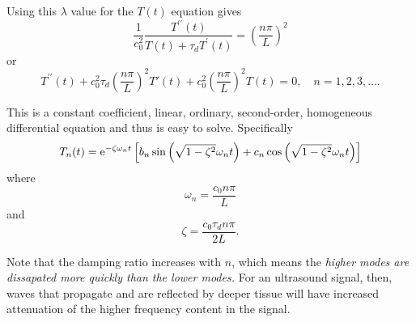Using this $\lambda$ value for the $T(t)$ equation gives
\[
 \frac{1}{c_0^2} \frac{T^{\prime \prime}(t)}{T(t) + \tau_d T^{\prime}(t)} = \left( \frac{n \pi}{L} \right)^2
 \]
 or
 \[
 T^{\prime \prime}(t) + c_0^2 \tau_d \left(\frac{n \pi}{L}\right)^2 T'(t) +  c_0^2 \left(\frac{n \pi}{L}\right)^2 T(t) = 0, \quad n=1,2,3,\ldots.
\]

This is a constant coefficient, linear, ordinary, second-order, homogeneous differential equation and thus is easy to solve. Specifically
\[
T_n(t) = \operatorname{e}^{-\zeta \omega_n t} \left[ b_n \sin \left( \sqrt{1 - \zeta^2} \omega_n t \right) + c_n \cos \left( \sqrt{1 - \zeta^2} \omega_n t \right) \right]
\]
where
\[
\omega_n = \frac{c_0 n \pi}{L}
\]
and
\[
\zeta = \frac{c_0 \tau_d n \pi}{2 L}.
\]

Note that the damping ratio increases with $n$, which means the \emph{higher modes are dissapated more quickly than the lower modes.} For an ultrasound signal, then, waves that propagate and are reflected by deeper tissue will have increased attenuation of the higher frequency content in the signal. 

